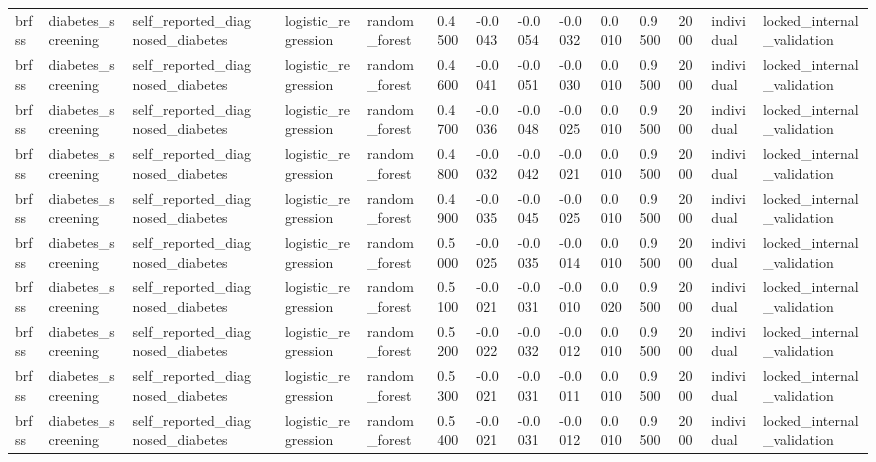 \begin{tabular}{lllllllllllllll}
brfss & diabetes\_screening & self\_reported\_diagnosed\_diabetes &  & logistic\_regression & random\_forest & 0.4500 & -0.0043 & -0.0054 & -0.0032 & 0.0010 & 0.9500 & 2000 & individual & locked\_internal\_validation \\
brfss & diabetes\_screening & self\_reported\_diagnosed\_diabetes &  & logistic\_regression & random\_forest & 0.4600 & -0.0041 & -0.0051 & -0.0030 & 0.0010 & 0.9500 & 2000 & individual & locked\_internal\_validation \\
brfss & diabetes\_screening & self\_reported\_diagnosed\_diabetes &  & logistic\_regression & random\_forest & 0.4700 & -0.0036 & -0.0048 & -0.0025 & 0.0010 & 0.9500 & 2000 & individual & locked\_internal\_validation \\
brfss & diabetes\_screening & self\_reported\_diagnosed\_diabetes &  & logistic\_regression & random\_forest & 0.4800 & -0.0032 & -0.0042 & -0.0021 & 0.0010 & 0.9500 & 2000 & individual & locked\_internal\_validation \\
brfss & diabetes\_screening & self\_reported\_diagnosed\_diabetes &  & logistic\_regression & random\_forest & 0.4900 & -0.0035 & -0.0045 & -0.0025 & 0.0010 & 0.9500 & 2000 & individual & locked\_internal\_validation \\
brfss & diabetes\_screening & self\_reported\_diagnosed\_diabetes &  & logistic\_regression & random\_forest & 0.5000 & -0.0025 & -0.0035 & -0.0014 & 0.0010 & 0.9500 & 2000 & individual & locked\_internal\_validation \\
brfss & diabetes\_screening & self\_reported\_diagnosed\_diabetes &  & logistic\_regression & random\_forest & 0.5100 & -0.0021 & -0.0031 & -0.0010 & 0.0020 & 0.9500 & 2000 & individual & locked\_internal\_validation \\
brfss & diabetes\_screening & self\_reported\_diagnosed\_diabetes &  & logistic\_regression & random\_forest & 0.5200 & -0.0022 & -0.0032 & -0.0012 & 0.0010 & 0.9500 & 2000 & individual & locked\_internal\_validation \\
brfss & diabetes\_screening & self\_reported\_diagnosed\_diabetes &  & logistic\_regression & random\_forest & 0.5300 & -0.0021 & -0.0031 & -0.0011 & 0.0010 & 0.9500 & 2000 & individual & locked\_internal\_validation \\
brfss & diabetes\_screening & self\_reported\_diagnosed\_diabetes &  & logistic\_regression & random\_forest & 0.5400 & -0.0021 & -0.0031 & -0.0012 & 0.0010 & 0.9500 & 2000 & individual & locked\_internal\_validation \\

\end{tabular}
